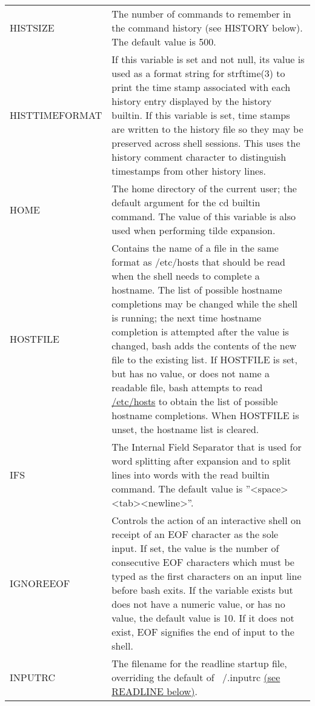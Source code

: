 \documentclass[11pt]{article}
\begin{document}
\begin{longtable}{p{}p{}}
HISTSIZE &
The number of commands to remember in the command history (see HISTORY below). The default value is 500. \\

HISTTIMEFORMAT &
If this variable is set and not null, its value is used as a format string for strftime(3) to print the time stamp associated with each history entry displayed by the history builtin. If this variable is set, time stamps are written to the history file so they may be preserved across shell sessions. This uses the history comment character to distinguish timestamps from other history lines. \\

HOME &
The home directory of the current user; the default argument for the cd builtin command. The value of this variable is also used when performing tilde expansion. \\

HOSTFILE &
Contains the name of a file in the same format as /etc/hosts that should be read when the shell needs to complete a hostname. The list of possible hostname completions may be changed while the shell is running; the next time hostname completion is attempted after the value is changed, bash adds the contents of the new file to the existing list. If HOSTFILE is set, but has no value, or does not name a readable file, bash attempts to read \url{/etc/hosts} to obtain the list of possible hostname completions. When HOSTFILE is unset, the hostname list is cleared. \\

IFS &
The Internal Field Separator that is used for word splitting after expansion and to split lines into words with the read builtin command. The default value is ''<space><tab><newline>''. \\

IGNOREEOF &
Controls the action of an interactive shell on receipt of an EOF character as the sole input. If set, the value is the number of consecutive EOF characters which must be typed as the first characters on an input line before bash exits. If the variable exists but does not have a numeric value, or has no value, the default value is 10. If it does not exist, EOF signifies the end of input to the shell. \\

INPUTRC &
The filename for the readline startup file, overriding the default of ~/.inputrc \hyperref[sec:readline]{(see READLINE below)}. \\


\end{longtable}
\end{document}
